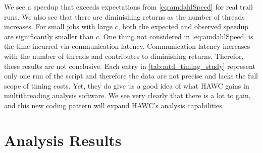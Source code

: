 We see a speedup that exceeds expectations from \cref{eq:amdahlSpeed} for real trail runs.
We also see that there are diminishing returns as the number of threads increases.
For small jobs with large $c$, both the expected and observed speedup are significantly smaller than $c$.
One thing not considered in \cref{eq:amdahlSpeed} is the time incurred via communication latency.
Communication latency increases with the number of threads and contributes to diminishing returns.
Therefor, these results are not conclusive.
Each entry in \cref{tab:mtd_timing_study} represent only one run of the script and therefore the data are not precise and lacks the full scope of timing costs.
Yet, they do give us a good idea of what HAWC gains in multithreading analysis software.
We see very clearly that there is a lot to gain, and this new coding pattern will expand HAWC's analysis capabilities.

\section{Analysis Results}\label{sec:mtd_results}

